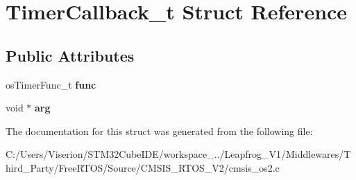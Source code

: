 \hypertarget{struct_timer_callback__t}{}\section{Timer\+Callback\+\_\+t Struct Reference}
\label{struct_timer_callback__t}
\subsection*{Public Attributes}
\begin{DoxyCompactItemize}
\item 
\mbox{\label{struct_timer_callback__t_a37f4326608a0aa016b1b6fe697153262}} 
os\+Timer\+Func\+\_\+t {\bfseries func}
\item 
\mbox{\label{struct_timer_callback__t_a7753be50886fbeb70e0097bf380b42f6}} 
void $\ast$ {\bfseries arg}
\end{DoxyCompactItemize}


The documentation for this struct was generated from the following file\+:\begin{DoxyCompactItemize}
\item 
C\+:/\+Users/\+Viserion/\+S\+T\+M32\+Cube\+I\+D\+E/workspace\+\_../\+Leapfrog\+\_\+\+V1/\+Middlewares/\+Third\+\_\+\+Party/\+Free\+R\+T\+O\+S/\+Source/\+C\+M\+S\+I\+S\+\_\+\+R\+T\+O\+S\+\_\+\+V2/cmsis\+\_\+os2.\+c\end{DoxyCompactItemize}
